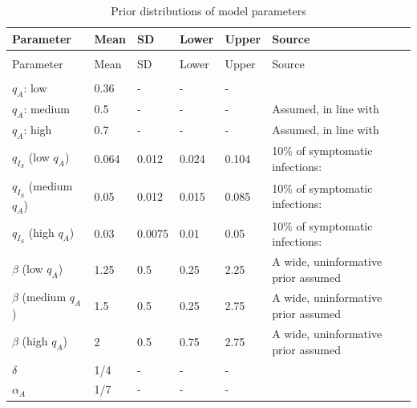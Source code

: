 \documentclass[11pt]{article}
\begin{document}
\begin{spacing}{.8}
	\begin{longtable}[H] {p{} p{} p{} p{} p{} p{} }
		\caption{Prior distributions of model parameters} \\
		Parameter & Mean & SD & Lower & Upper & Source   \\[0.5em] \hline
		{} & {} & {} & {} & {} & {} \\
		\endfirsthead
		Parameter & Mean & SD & Lower & Upper & Source  \\[0.5em] \hline
		{} & {} & {} & {} & {} & {}  \\
		\endhead
		$q_A$: low & 0.36 & {-} & {-} & {-} & \citep{nishiura2020estimation, mizumoto2020estimating, russell2020estimating}  \\[0.5em]
		$q_A$: medium & 0.5 & {-} & {-} & {-} & Assumed, in line with \citep{he2020estimation, emery2020contribution, kimball2020asymptomatic} \\[0.5em]
		$q_A$: high & 0.7  & {-} & {-} & {-} & Assumed, in line with \citep{he2020estimation, emery2020contribution, kimball2020asymptomatic} \\[0.5em]
		$q_{I_S}$ (low $q_A$) & 0.064 & 0.012 & 0.024 & 0.104 & 10\% of symptomatic infections: \citep{verity2020estimates, bi2020epidemiology, salje2020estimating} \\[0.5em]
		$q_{I_S}$ (medium $q_A$) & 0.05 & 0.012 & 0.015 & 0.085 & 10\% of symptomatic infections: \citep{verity2020estimates, bi2020epidemiology, salje2020estimating} \\[0.5em]
		$q_{I_S}$ (high $q_A$) & 0.03 & 0.0075 & 0.01 & 0.05 & 10\% of symptomatic infections: \citep{verity2020estimates, bi2020epidemiology, salje2020estimating} \\[0.5em]
		$\beta$ (low $q_A$) & 1.25 & 0.5 & 0.25 & 2.25 & A wide, uninformative prior assumed \\[0.5em]
		$\beta$ (medium $q_A$) & 1.5 & 0.5 & 0.25 & 2.75 & A wide, uninformative prior assumed \\[0.5em]
		$\beta$ (high $q_A$) & 2 & 0.5 & 0.75 & 2.75 & A wide, uninformative prior assumed \\[0.5em]
		$\delta$ & 1/4 & {-} & {-} & {-} & \citep{lauer2020incubation, bi2020epidemiology, li2020early, linton2020incubation, he2020estimation, salje2020estimating, wei2020presymptomatic} \\[0.5em]
		$\alpha_A$ & 1/7 & {-} & {-} & {-} & \citep{wolfel2020virological} \\[0.5em]

\end{longtable}
\end{spacing}
\end{document}
